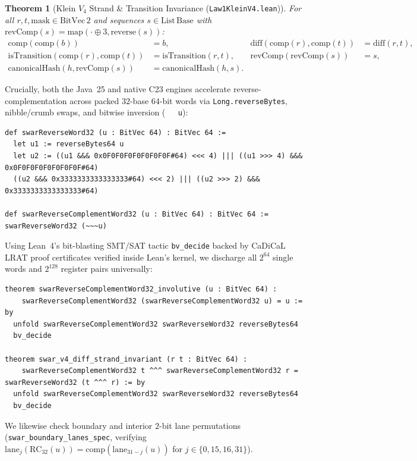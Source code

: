 \documentclass[10pt]{article}
\newtheorem{theorem}{Theorem}
\begin{document}
\begin{theorem}[Klein $V_4$ Strand \& Transition Invariance (\texttt{Law1KleinV4.lean})]
For all $r, t, \text{mask} \in \mathrm{BitVec}\,2$ and sequences $s \in \mathrm{List}\,\mathrm{Base}$ with $\mathrm{revComp}(s) = \mathrm{map}(\cdot \oplus 3, \mathrm{reverse}(s))$:
\begin{align}
  \mathrm{comp}(\mathrm{comp}(b)) &= b, &
  \mathrm{diff}(\mathrm{comp}(r), \mathrm{comp}(t)) &= \mathrm{diff}(r, t), \\
  \mathrm{isTransition}(\mathrm{comp}(r), \mathrm{comp}(t)) &= \mathrm{isTransition}(r, t), &
  \mathrm{revComp}(\mathrm{revComp}(s)) &= s, \\
  \mathrm{canonicalHash}(h, \mathrm{revComp}(s)) &= \mathrm{canonicalHash}(h, s).
\end{align}
\end{theorem}

Crucially, both the Java~25 and native C23 engines accelerate reverse-complementation across packed $32$-base $64$-bit words via \texttt{Long.reverseBytes}, nibble/crumb swaps, and bitwise inversion (\texttt{~~~u}):
\begin{lstlisting}
def swarReverseWord32 (u : BitVec 64) : BitVec 64 :=
  let u1 := reverseBytes64 u
  let u2 := ((u1 &&& 0x0F0F0F0F0F0F0F0F#64) <<< 4) ||| ((u1 >>> 4) &&& 0x0F0F0F0F0F0F0F0F#64)
  ((u2 &&& 0x3333333333333333#64) <<< 2) ||| ((u2 >>> 2) &&& 0x3333333333333333#64)

def swarReverseComplementWord32 (u : BitVec 64) : BitVec 64 := swarReverseWord32 (~~~u)
\end{lstlisting}
Using Lean~4's bit-blasting SMT/SAT tactic \texttt{bv\_decide} backed by CaDiCaL LRAT proof certificates verified inside Lean's kernel, we discharge all $2^{64}$ single words and $2^{128}$ register pairs universally:
\begin{lstlisting}
theorem swarReverseComplementWord32_involutive (u : BitVec 64) :
    swarReverseComplementWord32 (swarReverseComplementWord32 u) = u := by
  unfold swarReverseComplementWord32 swarReverseWord32 reverseBytes64
  bv_decide

theorem swar_v4_diff_strand_invariant (r t : BitVec 64) :
    swarReverseComplementWord32 t ^^^ swarReverseComplementWord32 r = swarReverseWord32 (t ^^^ r) := by
  unfold swarReverseComplementWord32 swarReverseWord32 reverseBytes64
  bv_decide
\end{lstlisting}
We likewise check boundary and interior $2$-bit lane permutations (\texttt{swar\_boundary\_lanes\_spec}, verifying $\mathrm{lane}_j(\mathrm{RC}_{32}(u)) = \mathrm{comp}(\mathrm{lane}_{31-j}(u))$ for $j \in \{0, 15, 16, 31\}$).
\end{document}
